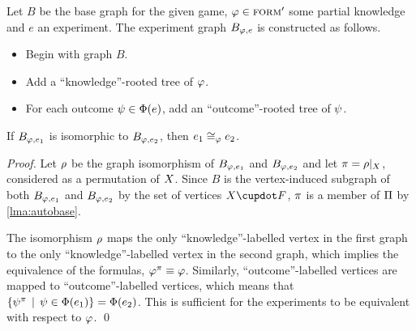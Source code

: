 Let $B$ be the base graph for the given game, $\varphi\in{\textsc{form}'}$ some partial knowledge
  and $e$ an experiment.
The experiment graph $B_{\varphi, e}$ is constructed as follows.
\begin{itemize}
\item Begin with graph $B$.
\item Add a ``knowledge''-rooted tree of $\varphi$.
\item For each outcome $\psi\in\Phi(e)$, add an ``outcome''-rooted tree of $\psi$.
\end{itemize}

\begin{theorem} \label{thm:isoequiv}
If $B_{\varphi, e_1}$ is isomorphic to $B_{\varphi, e_2}$, then
 $e_1 \cong_{\varphi} e_2$.
\end{theorem}

\begin{proof}
Let $\rho$ be the graph isomorphism of $B_{\varphi, e_1}$ and $B_{\varphi, e_2}$ and let
  $\pi = \rho|_X$, considered as a permutation of $X$.
Since $B$ is the vertex-induced subgraph of both $B_{\varphi,e_1}$ and $B_{\varphi, e_2}$ by
  the set of vertices $\Var\cupdot F$, $\pi$ is a member of $\Pi$ by \autoref{lma:autobase}.

The isomorphism $\rho$ maps the only ``knowledge''-labelled vertex in the first graph
  to the only ``knowledge''-labelled vertex in the second graph,
  which implies the equivalence of the formulas, $\varphi^\pi \equiv \varphi$.
Similarly, ``outcome''-labelled vertices are mapped to ``outcome''-labelled vertices,
  which means that $\{\psi^\pi \:\:|\:\: \psi\in\Phi(e_1)\} = \Phi(e_2)$.
This is sufficient for the experiments to be equivalent with respect to $\varphi$.
  \qed
\end{proof}

